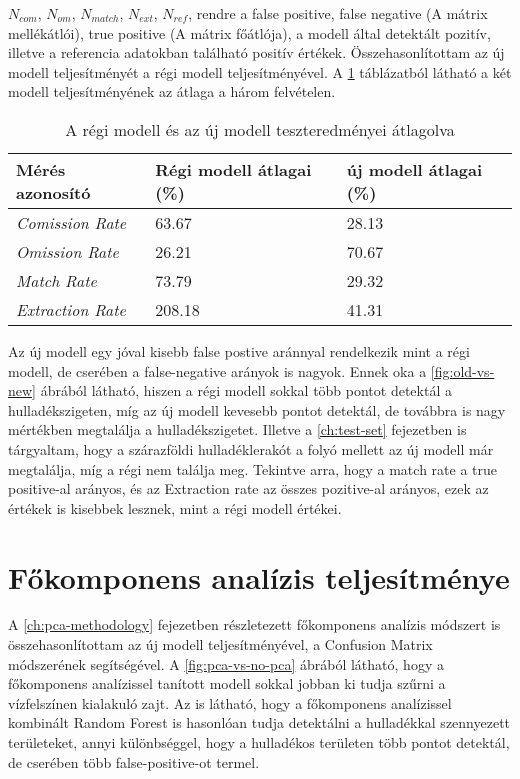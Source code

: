 $N_{com}$, $N_{om}$, $N_{match}$, $N_{ext}$, $N_{ref}$, rendre a false positive, false negative (A mátrix mellékátlói), true positive (A mátrix főátlója), a modell által detektált pozitív, illetve a referencia adatokban található positív értékek. Összehasonlítottam az új modell teljesítményét a régi modell teljesítményével. A \ref{tab:old-vs-new} táblázatból látható a két modell teljesítményének az átlaga a három felvételen.

\begin{table}[H]
	\centering
	\begin{tabular}{ | p{} | p{} | p{} | }
		\hline
		\textbf{Mérés azonosító} & \textbf{Régi modell átlagai (\%)} & \textbf{új modell átlagai (\%)} \\
		\hline \hline
		\emph{Comission Rate} & 63.67 & 28.13 \\
		\hline
		\emph{Omission Rate} & 26.21 & 70.67 \\
		\hline
		\emph{Match Rate} & 73.79 & 29.32 \\
		\hline
        \emph{Extraction Rate} & 208.18 & 41.31 \\
		\hline
	\end{tabular}
	\caption{A régi modell és az új modell teszteredményei átlagolva}
	\label{tab:old-vs-new}
\end{table}

Az új modell egy jóval kisebb false postive aránnyal rendelkezik mint a régi modell, de cserében a false-negative arányok is nagyok. Ennek oka a \ref{fig:old-vs-new} ábrából látható, hiszen a régi modell sokkal több pontot detektál a hulladékszigeten, míg az új modell kevesebb pontot detektál, de továbbra is nagy mértékben megtalálja a hulladékszigetet. Illetve a \ref{ch:test-set} fejezetben is tárgyaltam, hogy a szárazföldi hulladéklerakót a folyó mellett az új modell már megtalálja, míg a régi nem találja meg. Tekintve arra, hogy a match rate a true positive-al arányos, és az Extraction rate az összes pozitive-al arányos, ezek az értékek is kisebbek lesznek, mint a régi modell értékei.

\section{Főkomponens analízis teljesítménye}
\label{ch:pca-performance}

A \ref{ch:pca-methodology} fejezetben részletezett főkomponens analízis módszert is összehasonlítottam az új modell teljesítményével, a Confusion Matrix módszerének segítségével. A \ref{fig:pca-vs-no-pca} ábrából látható, hogy a főkomponens analízissel tanított modell sokkal jobban ki tudja szűrni a vízfelszínen kialakuló zajt. Az is látható, hogy a főkomponens analízissel kombinált Random Forest is hasonlóan tudja detektálni a hulladékkal szennyezett területeket, annyi különbséggel, hogy a hulladékos területen több pontot detektál, de cserében több false-positive-ot termel.


